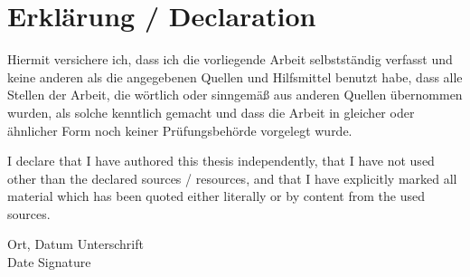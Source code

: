 \clearpage

\pagestyle{useheadings} %

\chapter*{Erklärung / Declaration}

Hiermit versichere ich, dass ich die vorliegende Arbeit selbstständig verfasst und keine anderen als die angegebenen Quellen und Hilfsmittel benutzt habe, dass alle Stellen der Arbeit, die wörtlich oder sinngemäß aus anderen Quellen übernommen wurden, als solche kenntlich gemacht und dass die Arbeit in gleicher oder ähnlicher Form noch keiner Prüfungsbehörde vorgelegt wurde.

\vspace{15mm}

I declare that I have authored this thesis independently, that I have not used other than the declared
sources / resources, and that I have explicitly marked all material which has been quoted either
literally or by content from the used sources.

\vspace{5cm}
Ort, Datum \hspace{10cm} Unterschrift\\
Date \hspace{11.5cm} Signature\\



\tableofcontents



\listoffigures





